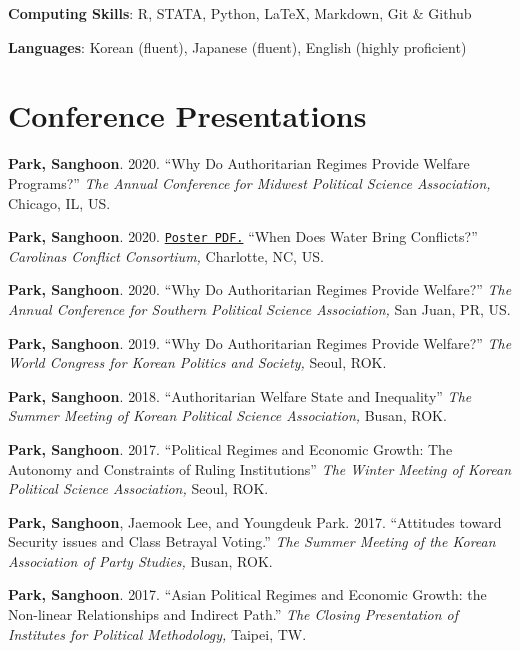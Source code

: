 \documentclass[margin,line]{res}
\begin{document}
\begin{resume}
{\bf Computing Skills}: R, STATA, Python, \LaTeX, Markdown, Git \& Github

\vspace*{-3mm}
{\bf Languages}:  Korean (fluent), Japanese (fluent), English (highly proficient)

\section{\sc Conference Presentations}

{\bf Park, Sanghoon}. {2020.} {``Why Do Authoritarian Regimes Provide Welfare Programs?''} {\it The Annual Conference for Midwest Political Science Association,} Chicago, IL, US.

\vspace{-.25cm}
{\bf Park, Sanghoon}. {2020.} \href{https://www.dropbox.com/s/7xr90ielm1vh1sd/poster.pdf?dl=0}{\tt Poster PDF.} {``When Does Water Bring Conflicts?''} {\it Carolinas Conflict Consortium,} Charlotte, NC, US.

\vspace{-.25cm}
{\bf Park, Sanghoon}. {2020.} {``Why Do Authoritarian Regimes Provide Welfare?''} {\it The Annual Conference for Southern Political Science Association,} San Juan, PR, US.

\vspace{-.25cm}
{\bf Park, Sanghoon}. {2019.} {``Why Do Authoritarian Regimes Provide Welfare?''} {\it The World Congress for Korean Politics and Society,} Seoul, ROK.

\vspace{-.25cm}
{\bf Park, Sanghoon}. {2018.} {``Authoritarian Welfare State and Inequality''} {\it The Summer Meeting of Korean Political Science Association,} Busan, ROK.

\vspace{-.25cm}
{\bf Park, Sanghoon}. {2017.} {``Political Regimes and Economic Growth: The Autonomy and Constraints of Ruling Institutions''} {\it The Winter Meeting of Korean Political Science Association,} Seoul, ROK.

\vspace{-.25cm}
{\bf Park, Sanghoon}, Jaemook Lee, and Youngdeuk Park. {2017.} {``Attitudes toward Security issues and Class Betrayal Voting.''} {\it The Summer Meeting of the Korean Association of Party Studies,} Busan, ROK.

\vspace{-.25cm}
{\bf Park, Sanghoon}. {2017.} {``Asian Political Regimes and Economic Growth: the Non-linear Relationships and Indirect Path.''} {\it The Closing Presentation of Institutes for Political Methodology,} Taipei, TW.


\end{resume}
\end{document}
